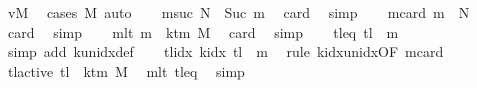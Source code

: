 \begin{isabellebody}
\ vM\ \isamarkupfalse%
\ {\isacharparenleft}{\kern0pt}cases\ M{\isacharparenright}{\kern0pt}\ auto\isanewline
\ \ \isamarkupfalse%
\ m{}suc{\isacharcolon}{\kern0pt}\ {\isachardoublequoteopen}{\isacharquery}{\kern0pt}N\ {\isacharequal}{\kern0pt}\ Suc\ {\isacharquery}{\kern0pt}m{}{\isachardoublequoteclose}\ \isamarkupfalse%
\ card{}\ \isamarkupfalse%
\ simp\isanewline
\ \ \isamarkupfalse%
\ m{}card{\isacharcolon}{\kern0pt}\ {\isachardoublequoteopen}{\isacharquery}{\kern0pt}m{}\ {\isacharless}{\kern0pt}\ {\isacharquery}{\kern0pt}N{\isachardoublequoteclose}\ \isamarkupfalse%
\ card{}\ \isamarkupfalse%
\ simp\isanewline
\ \ \isamarkupfalse%
\ m{}lt{\isacharcolon}{\kern0pt}\ {\isachardoublequoteopen}{\isacharquery}{\kern0pt}m{}\ {\isacharless}{\kern0pt}\ k{\isacharunderscore}{\kern0pt}tm\ M{\isachardoublequoteclose}\ \isamarkupfalse%
\ card{}\ \isamarkupfalse%
\ simp\isanewline
\ \ \isamarkupfalse%
\ tl{\isacharunderscore}{\kern0pt}eq{\isacharcolon}{\kern0pt}\ {\isachardoublequoteopen}{\isacharquery}{\kern0pt}tl\ {\isacharequal}{\kern0pt}\ {\isacharquery}{\kern0pt}m{}{\isachardoublequoteclose}\ \isamarkupfalse%
\ {\isacharparenleft}{\kern0pt}simp\ add{\isacharcolon}{\kern0pt}\ k{\isacharunderscore}{\kern0pt}unidx{\isacharunderscore}{\kern0pt}def{\isacharparenright}{\kern0pt}\isanewline
\ \ \isamarkupfalse%
\ tlidx{\isacharcolon}{\kern0pt}\ {\isachardoublequoteopen}k{\isacharunderscore}{\kern0pt}idx\ {\isacharquery}{\kern0pt}tl\ {\isacharequal}{\kern0pt}\ {\isacharquery}{\kern0pt}m{}{\isachardoublequoteclose}\ \isamarkupfalse%
\ {\isacharparenleft}{\kern0pt}rule\ k{\isacharunderscore}{\kern0pt}idx{\isacharunderscore}{\kern0pt}unidx{\isacharbrackleft}{\kern0pt}OF\ m{}card{\isacharbrackright}{\kern0pt}{\isacharparenright}{\kern0pt}\isanewline
\ \ \isamarkupfalse%
\ tl{\isacharunderscore}{\kern0pt}active{\isacharcolon}{\kern0pt}\ {\isachardoublequoteopen}{\isacharquery}{\kern0pt}tl\ {\isacharless}{\kern0pt}\ k{\isacharunderscore}{\kern0pt}tm\ M{\isachardoublequoteclose}\ \isamarkupfalse%
\ m{}lt\ tl{\isacharunderscore}{\kern0pt}eq\ \isamarkupfalse%
\ simp\isanewline
\ \ \isamarkupfalse%

\end{isabellebody}
